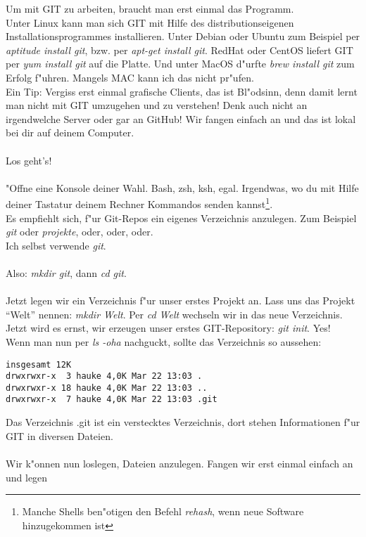 \documentclass[german,a4paper]{report}
\begin{document}
Um mit GIT zu arbeiten, braucht man erst einmal das Programm.\\
Unter Linux kann man sich GIT mit Hilfe des distributionseigenen Installationsprogrammes
installieren. Unter Debian oder Ubuntu zum Beispiel per \textit{aptitude install git}, bzw. per
\textit{apt-get install git}. RedHat oder CentOS liefert GIT per \textit{yum install git}
auf die Platte. Und unter MacOS d"urfte \textit{brew install git} zum Erfolg f"uhren. Mangels
MAC kann ich das nicht pr"ufen.\\
Ein Tip: Vergiss erst einmal grafische Clients, das ist Bl"odsinn, denn damit lernt man nicht
mit GIT umzugehen und zu verstehen! Denk auch nicht an irgendwelche Server oder gar an GitHub!
Wir fangen einfach an und das ist lokal bei dir auf deinem Computer.\\
\\
Los geht's!\\
\\
"Offne eine Konsole deiner Wahl. Bash, zsh, ksh, egal. Irgendwas, wo du mit Hilfe deiner
Tastatur deinem Rechner Kommandos senden kannst\footnote{Manche Shells ben"otigen den
Befehl \textit{rehash}, wenn neue Software hinzugekommen ist}.\\
Es empfiehlt sich, f"ur Git-Repos ein eigenes Verzeichnis anzulegen. Zum Beispiel \textit{git}
oder \textit{projekte}, oder, oder, oder.\\
Ich selbst verwende \textit{git}.\\
\\
Also: \textit{mkdir git}, dann \textit{cd git}.\\
\\
Jetzt legen wir ein Verzeichnis f"ur unser erstes Projekt an. Lass uns das Projekt ``Welt''
nennen: \textit{mkdir Welt}. Per \textit{cd Welt} wechseln wir in das neue Verzeichnis.\\
Jetzt wird es ernst, wir erzeugen unser erstes GIT-Repository: \textit{git init}. Yes!\\
Wenn man nun per \textit{ls -oha} nachguckt, sollte das Verzeichnis so aussehen:
\begin{verbatim}
insgesamt 12K
drwxrwxr-x  3 hauke 4,0K Mar 22 13:03 .
drwxrwxr-x 18 hauke 4,0K Mar 22 13:03 ..
drwxrwxr-x  7 hauke 4,0K Mar 22 13:03 .git
\end{verbatim}
Das Verzeichnis .git ist ein verstecktes Verzeichnis, dort stehen Informationen f"ur GIT in
diversen Dateien.\\
\\
Wir k"onnen nun loslegen, Dateien anzulegen. Fangen wir erst einmal einfach an und legen
\end{document}
